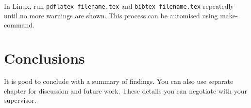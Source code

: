 In Linux, run \texttt{pdflatex filename.tex} and \texttt{bibtex filename.tex} repeatedly until no more warnings are shown. This process can be automised using make-command.
 
\chapter{Conclusions\label{chapter:conclusions}}

It is good to conclude with a summary of findings. You can also use separate chapter for discussion and future work. These details you can negotiate with your supervisor.
